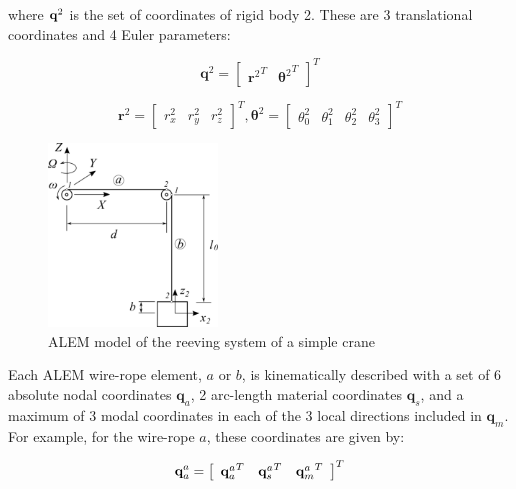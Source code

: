 \setlength{\parindent}{0cm}
where ${{\bf{q}}^{2}}$ is the set of coordinates of rigid body 2. These are 3 translational coordinates and 4 Euler parameters:

\begin{equation}
    {{\textbf{q}}}^{2} = {\left[ {\begin{array}{*{20}{c}}{\textbf{r}^{2}}^T&{\boldsymbol{\theta}^{2}}^T \end{array}} \right]^T}
\end{equation}

\begin{equation}
  {\textbf{r}}^{2} = {\left[ {\begin{array}{*{20}{c}}{{{r}}_x^{2}}&{{{r}}_y^{2}}&
  {{{r}}_z^{2}} \end{array}} \right]^T},     \boldsymbol{\theta}^{2} = {\left[ {\begin{array}{*{20}{c}}{{\theta_{0}^{2}}}&{{\theta_{1}^{2}}}&{{\theta_{2}^{2}}}&{{\theta_{3}^{2}}}\end{array}} \right]^T}  
\end{equation}

\begin{figure}
    \centering
    \includegraphics[width=0.4\textwidth]{Figures/simpleCrane.png}
    \caption{ALEM model of the reeving system of a simple crane}
    \label{fig:ex_reeving_system}
\end{figure}

Each ALEM wire-rope element, $a$ or $b$, is kinematically described with a set of 6 absolute nodal coordinates $\textbf{q}_a$, 2 arc-length material coordinates $\textbf{q}_s$, and a maximum of 3 modal coordinates in each of the 3 local directions included in $\textbf{q}_m$. For example, for the wire-rope $a$, these coordinates are given by:

\begin{equation}
  {\textbf{q}}_a^{a} = {\left[ {\begin{array}{*{20}{c}}{{{\bf{q}}_a^{a}}^T}&{{{\bf{q}}_s^{a}}^T} & {{{\bf{q}}_m^{a}}^T} \end{array}} \right]^T}
\end{equation}

